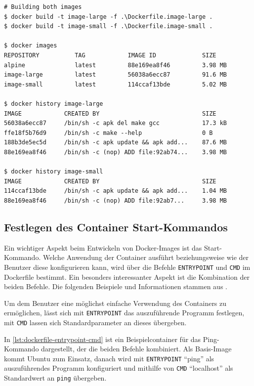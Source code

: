 \begin{lstlisting}[caption=Vergleich der Imagegröße nach Optimierung des RUN-Befehls, label=lst:dockerfile-run-imagesize]
# Building both images
$ docker build -t image-large -f .\Dockerfile.image-large .
$ docker build -t image-small -f .\Dockerfile.image-small .

$ docker images
REPOSITORY          TAG            IMAGE ID             SIZE
alpine              latest         88e169ea8f46         3.98 MB
image-large         latest         56038a6ecc87         91.6 MB
image-small         latest         114ccaf13bde         5.02 MB

$ docker history image-large
IMAGE            CREATED BY                             SIZE
56038a6ecc87     /bin/sh -c apk del make gcc            17.3 kB
ffe18f5b76d9     /bin/sh -c make --help                 0 B
188b3de5ec5d     /bin/sh -c apk update && apk add...    87.6 MB
88e169ea8f46     /bin/sh -c (nop) ADD file:92ab74...    3.98 MB

$ docker history image-small
IMAGE            CREATED BY                             SIZE
114ccaf13bde     /bin/sh -c apk update && apk add...    1.04 MB
88e169ea8f46     /bin/sh -c (nop) ADD file:92ab7...     3.98 MB
\end{lstlisting}

\subsection{Festlegen des Container Start-Kommandos}
\label{sec:container-startup-command}
Ein wichtiger Aspekt beim Entwickeln von Docker-Images ist das Start-Kommando.
Welche Anwendung der Container ausführt beziehungsweise wie der Benutzer diese konfigurieren kann, wird über die Befehle \texttt{ENTRYPOINT} und \texttt{CMD} im Dockerfile bestimmt.
Ein besonders interessanter Aspekt ist die Kombination der beiden Befehle.
Die folgenden Beispiele und Informationen stammen aus \autocite{dockerfile-cmd-vs-entrypoint:online}.

Um dem Benutzer eine möglichst einfache Verwendung des Containers zu ermöglichen, lässt sich mit \texttt{ENTRYPOINT} das auszuführende Programm festlegen, mit \texttt{CMD} lassen sich Standardparameter an dieses übergeben.


In \cref{lst:dockerfile-entrypoint-cmd} ist ein Beispielcontainer für das Ping-Kommando dargestellt, der die beiden Befehle kombiniert.
Als Basis-Image kommt Ubuntu zum Einsatz, danach wird mit \texttt{ENTRYPOINT} "`ping"' als auszuführendes Programm konfiguriert und mithilfe von \texttt{CMD} "`localhost"' als Standardwert an \texttt{ping} übergeben.

